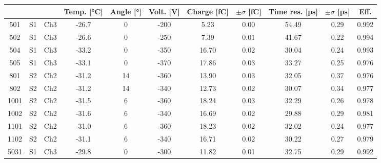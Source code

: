 \begin{tabular}{ccccccccccc}
\toprule
 &  &  & Temp. [°C] & Angle [°] & Volt. [V] & Charge [fC] & \(\pm\sigma\) [fC] & Time res. [ps] & \(\pm\sigma\) [ps] & Eff. \\
\midrule
501 & S1 & Ch3 & -26.7 & 0 & -200 & 5.23 & 0.00 & 54.49 & 0.29 & 0.992 \\
502 & S1 & Ch3 & -26.6 & 0 & -250 & 7.39 & 0.01 & 41.67 & 0.22 & 0.994 \\
504 & S1 & Ch3 & -33.2 & 0 & -350 & 16.70 & 0.02 & 30.04 & 0.24 & 0.993 \\
505 & S1 & Ch3 & -33.1 & 0 & -370 & 17.86 & 0.03 & 33.27 & 0.25 & 0.976 \\
801 & S2 & Ch2 & -31.2 & 14 & -360 & 13.90 & 0.03 & 32.05 & 0.37 & 0.976 \\
802 & S2 & Ch2 & -31.2 & 14 & -340 & 12.73 & 0.02 & 30.07 & 0.34 & 0.977 \\
1001 & S2 & Ch2 & -31.5 & 6 & -360 & 18.24 & 0.03 & 32.29 & 0.26 & 0.978 \\
1002 & S2 & Ch2 & -31.6 & 6 & -340 & 16.69 & 0.02 & 29.88 & 0.29 & 0.981 \\
1101 & S2 & Ch2 & -31.0 & 6 & -360 & 18.23 & 0.02 & 32.02 & 0.24 & 0.977 \\
1102 & S2 & Ch2 & -31.1 & 6 & -340 & 16.71 & 0.02 & 30.22 & 0.27 & 0.979 \\
5031 & S1 & Ch3 & -29.8 & 0 & -300 & 11.82 & 0.01 & 32.75 & 0.29 & 0.992 \\
\bottomrule
\end{tabular}
